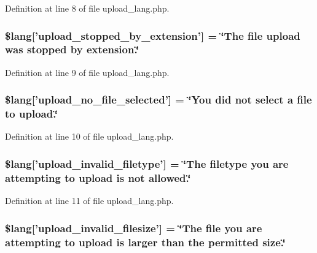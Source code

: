 Definition at line 8 of file upload\-\_\-lang.\-php.

\subsubsection[{\$lang}]{\setlength{\rightskip}{0pt plus 5cm}\$lang['upload\-\_\-stopped\-\_\-by\-\_\-extension'] = \char`\"{}The file upload was stopped by extension.\char`\"{}}\label{upload__lang_8php_ae97257deea3dddb33be4bbc6510a464b}


Definition at line 9 of file upload\-\_\-lang.\-php.

\subsubsection[{\$lang}]{\setlength{\rightskip}{0pt plus 5cm}\$lang['upload\-\_\-no\-\_\-file\-\_\-selected'] = \char`\"{}You did {\bf not} select {\bf a} file {\bf to} upload.\char`\"{}}\label{upload__lang_8php_a88d8e8f9b879d1c25e6c089f3d3b5a30}


Definition at line 10 of file upload\-\_\-lang.\-php.

\subsubsection[{\$lang}]{\setlength{\rightskip}{0pt plus 5cm}\$lang['upload\-\_\-invalid\-\_\-filetype'] = \char`\"{}The filetype you are attempting {\bf to} upload is {\bf not} allowed.\char`\"{}}\label{upload__lang_8php_ac8631aa85ed80396bd78e91a76d5fd38}


Definition at line 11 of file upload\-\_\-lang.\-php.

\subsubsection[{\$lang}]{\setlength{\rightskip}{0pt plus 5cm}\$lang['upload\-\_\-invalid\-\_\-filesize'] = \char`\"{}The file you are attempting {\bf to} upload is larger than the permitted size.\char`\"{}}\label{upload__lang_8php_a832b3ec1d84b1d48a488cf525954d8f2}


